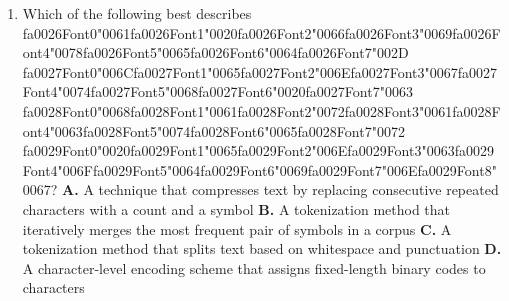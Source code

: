 \documentclass[11pt]{article}
\begin{document}
\begin{enumerate}[leftmargin=*]
  \item Which of the following best describes {\csname fa0026Font0\endcsname\char"0061}{\csname fa0026Font1\endcsname\char"0020}{\csname fa0026Font2\endcsname\char"0066}{\csname fa0026Font3\endcsname\char"0069}{\csname fa0026Font4\endcsname\char"0078}{\csname fa0026Font5\endcsname\char"0065}{\csname fa0026Font6\endcsname\char"0064}{\csname fa0026Font7\endcsname\char"002D} {\csname fa0027Font0\endcsname\char"006C}{\csname fa0027Font1\endcsname\char"0065}{\csname fa0027Font2\endcsname\char"006E}{\csname fa0027Font3\endcsname\char"0067}{\csname fa0027Font4\endcsname\char"0074}{\csname fa0027Font5\endcsname\char"0068}{\csname fa0027Font6\endcsname\char"0020}{\csname fa0027Font7\endcsname\char"0063} {\csname fa0028Font0\endcsname\char"0068}{\csname fa0028Font1\endcsname\char"0061}{\csname fa0028Font2\endcsname\char"0072}{\csname fa0028Font3\endcsname\char"0061}{\csname fa0028Font4\endcsname\char"0063}{\csname fa0028Font5\endcsname\char"0074}{\csname fa0028Font6\endcsname\char"0065}{\csname fa0028Font7\endcsname\char"0072} {\csname fa0029Font0\endcsname\char"0020}{\csname fa0029Font1\endcsname\char"0065}{\csname fa0029Font2\endcsname\char"006E}{\csname fa0029Font3\endcsname\char"0063}{\csname fa0029Font4\endcsname\char"006F}{\csname fa0029Font5\endcsname\char"0064}{\csname fa0029Font6\endcsname\char"0069}{\csname fa0029Font7\endcsname\char"006E}{\csname fa0029Font8\endcsname\char"0067}?
    \textbf{A.} A technique that compresses text by replacing consecutive repeated characters with a count and a symbol
    \textbf{B.} A tokenization method that iteratively merges the most frequent pair of symbols in a corpus
    \textbf{C.} A tokenization method that splits text based on whitespace and punctuation
    \textbf{D.} A character-level encoding scheme that assigns fixed-length binary codes to characters


\end{enumerate}
\end{document}

